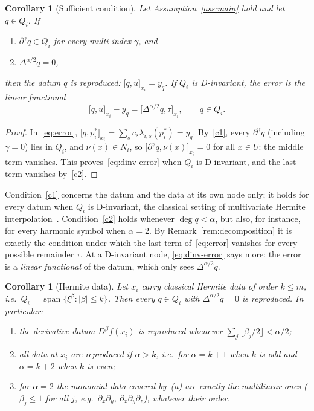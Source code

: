 \documentclass[12pt]{amsart}
\newtheorem{corollary}[theorem]{Corollary}
\theoremstyle{definition}
\theoremstyle{remark}
\newcommand{\fpz}[3]{\bigl[#1,#2\bigr]_{#3}}     %
\begin{document}
\begin{corollary}[Sufficient condition]\label{cor:exact}
Let Assumption~\ref{ass:main} hold and let $q\in Q_i$. If
\begin{enumerate}[label=(\roman*)]
  \item\label{c1} $\partial^\gamma q\in Q_i$ for every multi-index $\gamma$, and
  \item\label{c2} $\Delta^{\alpha/2}q=0$,
\end{enumerate}
then the datum $q$ is reproduced: $\fpz{q}{u}{x_i}=y_q$. If $Q_i$ is D-invariant, the error is
the linear functional
\begin{equation}\label{eq:dinv-error}
  \fpz{q}{u}{x_i}-y_q=\fpz{\Delta^{\alpha/2}q}{\tau}{x_i},\qquad q\in Q_i .
\end{equation}
\end{corollary}

\begin{proof}
In~\eqref{eq:error}, $\fpz{q}{p_i^*}{x_i}=\sum_sc_s\lambda_{i,s}(p_i^*)=y_q$. By~\ref{c1},
every $\partial^\gamma q$ (including $\gamma=0$) lies in $Q_i$, and $\nu(x)\in N_i$, so
$\fpz{\partial^\gamma q}{\nu(x)}{x_i}=0$ for all $x\in U$: the middle term vanishes. This
proves~\eqref{eq:dinv-error} when $Q_i$ is D-invariant, and the last term vanishes
by~\ref{c2}.
\end{proof}

Condition~\ref{c1} concerns the datum and the data at its own node only; it holds for every
datum when $Q_i$ is D-invariant, the classical setting of multivariate Hermite
interpolation~\cite{SauerXu1995,deBoor2005}. Condition~\ref{c2} holds whenever $\deg q<\alpha$,
but also, for instance, for every harmonic symbol when $\alpha=2$. By
Remark~\ref{rem:decomposition} it is exactly the condition under which the last term
of~\eqref{eq:error} vanishes for every possible remainder $\tau$. At a D-invariant node,
\eqref{eq:dinv-error} says more: the error is a \emph{linear functional} of the datum, which
only sees $\Delta^{\alpha/2}q$.

\begin{corollary}[Hermite data]\label{cor:hermite}
Let $x_i$ carry classical Hermite data of order $k\le m$, i.e.\
$Q_i=\operatorname{span}\{\xi^\beta:|\beta|\le k\}$. Then every $q\in Q_i$ with
$\Delta^{\alpha/2}q=0$ is reproduced. In particular:
\begin{enumerate}[label=(\alph*)]
  \item the derivative datum $D^\beta f(x_i)$ is reproduced whenever
        $\sum_j\lfloor\beta_j/2\rfloor<\alpha/2$;
  \item all data at $x_i$ are reproduced if $\alpha>k$, i.e.\ for $\alpha=k+1$ when $k$ is odd
        and $\alpha=k+2$ when $k$ is even;
  \item for $\alpha=2$ the monomial data covered by~(a) are exactly the multilinear ones
        ($\beta_j\le1$ for all $j$, e.g.\ $\partial_x\partial_y$,
        $\partial_x\partial_y\partial_z$), whatever their order.
\end{enumerate}
\end{corollary}
\end{document}
